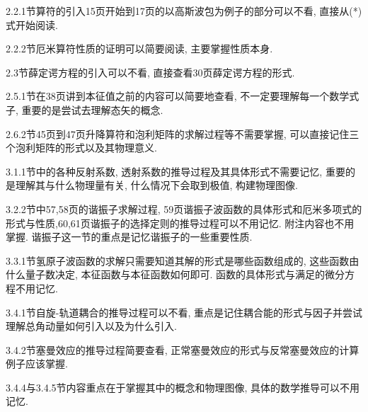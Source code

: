 \documentclass[12pt, a4paper, oneside]{report}
\theoremstyle{definition}
\theoremstyle{remark}
\begin{document}
2.2.1节算符的引入15页开始到17页的以高斯波包为例子的部分可以不看, 直接从(*)式开始阅读.

2.2.2节厄米算符性质的证明可以简要阅读, 主要掌握性质本身.

2.3节薛定谔方程的引入可以不看, 直接查看30页薛定谔方程的形式.

2.5.1节在38页讲到本征值之前的内容可以简要地查看, 不一定要理解每一个数学式子, 重要的是尝试去理解态矢的概念.

2.6.2节45页到47页升降算符和泡利矩阵的求解过程等不需要掌握, 可以直接记住三个泡利矩阵的形式以及其物理意义.

3.1.1节中的各种反射系数, 透射系数的推导过程及其具体形式不需要记忆, 重要的是理解其与什么物理量有关, 什么情况下会取到极值, 构建物理图像.

3.2.2节中57,58页的谐振子求解过程, 59页谐振子波函数的具体形式和厄米多项式的形式与性质,60,61页谐振子的选择定则的推导过程可以不用记忆. 附注内容也不用掌握. 谐振子这一节的重点是记忆谐振子的一些重要性质.

3.3.1节氢原子波函数的求解只需要知道其解的形式是哪些函数组成的, 这些函数由什么量子数决定, 本征函数与本征函数如何即可. 函数的具体形式与满足的微分方程不用记忆.

3.4.1节自旋-轨道耦合的推导过程可以不看, 重点是记住耦合能的形式与因子并尝试理解总角动量如何引入以及为什么引入.

3.4.2节塞曼效应的推导过程简要查看, 正常塞曼效应的形式与反常塞曼效应的计算例子应该掌握.

3.4.4与3.4.5节内容重点在于掌握其中的概念和物理图像, 具体的数学推导可以不用记忆.



\end{document}
